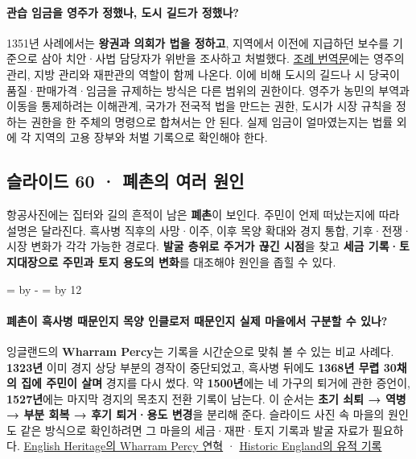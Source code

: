 \documentclass[10pt,a4paper]{article}
\newcommand{\ReserveQuestionSpace}{%
  \par\begingroup
  \dimen0=\pagegoal \advance\dimen0 by -\pagetotal
  \dimen2=\baselineskip \multiply\dimen2 by 12
  \ifdim\dimen0<\dimen2 \newpage\fi
  \endgroup}
\begin{document}
\paragraph{관습 임금을 영주가 정했나, 도시 길드가 정했나?}
1351년 사례에서는 \textbf{왕권과 의회가 법을 정하고}, 지역에서 이전에 지급하던 보수를 기준으로 삼아 치안·사법 담당자가 위반을 조사하고 처벌했다. \href{https://sourcebooks.web.fordham.edu/seth/statute-labourers.asp}{조례 번역문}에는 영주의 관리, 지방 관리와 재판관의 역할이 함께 나온다. 이에 비해 도시의 길드나 시 당국이 품질·판매가격·임금을 규제하는 방식은 다른 범위의 권한이다. 영주가 농민의 부역과 이동을 통제하려는 이해관계, 국가가 전국적 법을 만드는 권한, 도시가 시장 규칙을 정하는 권한을 한 주체의 명령으로 합쳐서는 안 된다. 실제 임금이 얼마였는지는 법률 외에 각 지역의 고용 장부와 처벌 기록으로 확인해야 한다.\par

\subsection{슬라이드 60 · 폐촌의 여러 원인}
항공사진에는 집터와 길의 흔적이 남은 \textbf{폐촌}이 보인다. 주민이 언제 떠났는지에 따라 설명은 달라진다. 흑사병 직후의 사망·이주, 이후 목양 확대와 경지 통합, 기후·전쟁·시장 변화가 각각 가능한 경로다. \textbf{발굴 층위로 주거가 끊긴 시점}을 찾고 \textbf{세금 기록·토지대장으로 주민과 토지 용도의 변화}를 대조해야 원인을 좁힐 수 있다.\par

\ReserveQuestionSpace
\paragraph{폐촌이 흑사병 때문인지 목양 인클로저 때문인지 실제 마을에서 구분할 수 있나?}
잉글랜드의 \textbf{Wharram Percy}는 기록을 시간순으로 맞춰 볼 수 있는 비교 사례다. \textbf{1323년} 이미 경지 상당 부분의 경작이 중단되었고, 흑사병 뒤에도 \textbf{1368년 무렵 30채의 집에 주민이 살며} 경지를 다시 썼다. 약 \textbf{1500년}에는 네 가구의 퇴거에 관한 증언이, \textbf{1527년}에는 마지막 경지의 목초지 전환 기록이 남는다. 이 순서는 \textbf{초기 쇠퇴 → 역병 → 부분 회복 → 후기 퇴거·용도 변경}을 분리해 준다. 슬라이드 사진 속 마을의 원인도 같은 방식으로 확인하려면 그 마을의 세금·재판·토지 기록과 발굴 자료가 필요하다. \href{https://www.english-heritage.org.uk/visit/places/wharram-percy-deserted-medieval-village/history/}{English Heritage의 Wharram Percy 연혁} · \href{https://historicengland.org.uk/listing/the-list/list-entry/1011377}{Historic England의 유적 기록}\par
\end{document}

